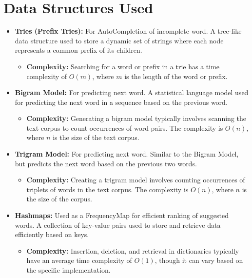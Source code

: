 \documentclass{article}
\begin{document}
\section*{Data Structures Used}
\begin{itemize}[label=-]
    \item \textbf{Tries (Prefix Tries):} For AutoCompletion of incomplete word. A tree-like data structure used to store a dynamic set of strings where each node represents a common prefix of its children.
    \begin{itemize}[label=--]
        \item \textbf{Complexity:} Searching for a word or prefix in a trie has a time complexity of \(O(m)\), where \(m\) is the length of the word or prefix.
    \end{itemize}
    \item \textbf{Bigram Model:} For predicting next word. A statistical language model used for predicting the next word in a sequence based on the previous word.
    \begin{itemize}[label=--]
        \item \textbf{Complexity:} Generating a bigram model typically involves scanning the text corpus to count occurrences of word pairs. The complexity is \(O(n)\), where \(n\) is the size of the text corpus.
    \end{itemize}
    \item \textbf{Trigram Model:} For predicting next word. Similar to the Bigram Model, but predicts the next word based on the previous two words.
    \begin{itemize}[label=--]
        \item \textbf{Complexity:} Creating a trigram model involves counting occurrences of triplets of words in the text corpus. The complexity is \(O(n)\), where \(n\) is the size of the corpus.
    \end{itemize}
    \item \textbf{Hashmaps:} Used as a FrequencyMap for efficient ranking of suggested words. A collection of key-value pairs used to store and retrieve data efficiently based on keys.
    \begin{itemize}[label=--]
        \item \textbf{Complexity:} Insertion, deletion, and retrieval in dictionaries typically have an average time complexity of \(O(1)\), though it can vary based on the specific implementation.
    \end{itemize}
\end{itemize}
\end{document}
